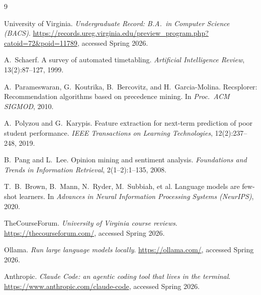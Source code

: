 \documentclass[10pt,letterpaper]{article}
\begin{document}

\begin{thebibliography}{9}
  \small

  University of Virginia.
  \newblock \emph{Undergraduate Record: B.A.\ in Computer Science (BACS)}.
  \newblock \url{https://records.ureg.virginia.edu/preview_program.php?catoid=72&poid=11789},
  accessed Spring 2026.

  A.~Schaerf.
  \newblock A survey of automated timetabling.
  \newblock \emph{Artificial Intelligence Review}, 13(2):87--127, 1999.

  A.~Parameswaran, G.~Koutrika, B.~Bercovitz, and H.~Garcia-Molina.
  \newblock Recsplorer: Recommendation algorithms based on precedence mining.
  \newblock In \emph{Proc.\ ACM SIGMOD}, 2010.

  A.~Polyzou and G.~Karypis.
  \newblock Feature extraction for next-term prediction of poor student
    performance.
  \newblock \emph{IEEE Transactions on Learning Technologies},
    12(2):237--248, 2019.

  B.~Pang and L.~Lee.
  \newblock Opinion mining and sentiment analysis.
  \newblock \emph{Foundations and Trends in Information Retrieval},
    2(1--2):1--135, 2008.

  T.~B.~Brown, B.~Mann, N.~Ryder, M.~Subbiah, et al.
  \newblock Language models are few-shot learners.
  \newblock In \emph{Advances in Neural Information Processing Systems
    (NeurIPS)}, 2020.

  TheCourseForum.
  \newblock \emph{University of Virginia course reviews}.
  \newblock \url{https://thecourseforum.com/}, accessed Spring 2026.

  Ollama.
  \newblock \emph{Run large language models locally}.
  \newblock \url{https://ollama.com/}, accessed Spring 2026.

  Anthropic.
  \newblock \emph{Claude Code: an agentic coding tool that lives in the
    terminal}.
  \newblock \url{https://www.anthropic.com/claude-code}, accessed
    Spring 2026.

\end{thebibliography}
\end{document}
